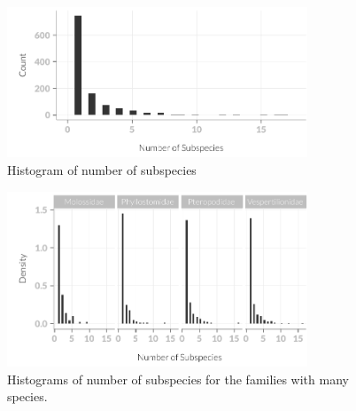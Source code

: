 \begin{knitrout}\footnotesize
{}\color{fgcolor}\begin{figure}[t]

{\centering \includegraphics[width=0.8\textwidth]{figure/wilsonReaderTaxonomyRead-1} 

}

\caption[Histogram of number of subspecies]{Histogram of number of subspecies}\label{fig:wilsonReaderTaxonomyRead}
\end{figure}


\end{knitrout}

\begin{knitrout}\footnotesize
{}\color{fgcolor}\begin{figure}[t]

{\centering \includegraphics[width=0.8\textwidth]{figure/subsHistsByFam-1} 

}

\caption[Histograms of number of subspecies for the families with many species]{Histograms of number of subspecies for the families with many species.}\label{fig:subsHistsByFam}
\end{figure}


\end{knitrout}



